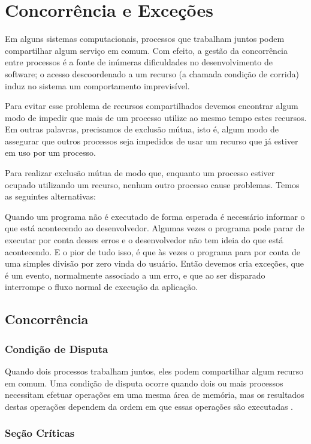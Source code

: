 \chapter{Concorrência e Exceções}

Em alguns sistemas computacionais, processos que trabalham juntos podem compartilhar algum 
serviço em comum. Com efeito, a gestão da concorrência entre processos é a fonte de inúmeras 
dificuldades no desenvolvimento de software; o acesso descoordenado a um recurso (a chamada 
condição de corrida) induz no sistema um comportamento imprevisível.

Para evitar esse problema de recursos compartilhados devemos encontrar algum modo de impedir 
que mais de um processo utilize ao mesmo tempo estes recursos. Em outras palavras, precisamos 
de exclusão mútua, isto é, algum modo de assegurar que outros processos seja impedidos de usar 
um recurso que já estiver em uso por um processo.

Para realizar exclusão mútua de modo que, enquanto um processo estiver ocupado utilizando um 
recurso, nenhum outro processo cause problemas. Temos as seguintes alternativas:

Quando um programa não é executado de forma esperada é necessário informar o que está acontecendo ao desenvolvedor. Algumas vezes o programa pode parar de executar por conta desses erros e o desenvolvedor não tem ideia do que está acontecendo. E o pior de tudo isso, é que às vezes o programa para por conta de uma simples divisão por zero vinda do usuário. Então devemos cria exceções, que é um evento, normalmente associado a um erro, e que ao ser disparado interrompe o fluxo normal de execução da aplicação.

\section{Concorrência}

\subsection{Condição de Disputa}

Quando dois processos trabalham juntos, eles podem compartilhar algum recurso em comum. Uma condição de disputa ocorre quando dois ou mais processos necessitam efetuar operações em uma mesma área de memória, mas os resultados destas operações dependem da ordem em que essas operações são executadas \cite{tanen}.

\subsection{Seção Críticas}

